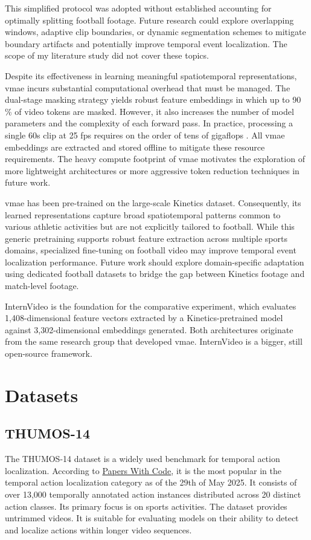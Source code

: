 This simplified protocol was adopted without established accounting for optimally splitting football footage. Future research could explore overlapping windows, adaptive clip boundaries, or dynamic segmentation schemes to mitigate boundary artifacts and potentially improve temporal event localization. The scope of my literature study did not cover these topics.

Despite its effectiveness in learning meaningful spatiotemporal representations, \acrfull{vmae} incurs substantial computational overhead that must be managed. The dual-stage masking strategy yields robust feature embeddings in which up to 90 \% of video tokens are masked. However, it also increases the number of model parameters and the complexity of each forward pass. In practice, processing a single 60s clip at 25 fps requires on the order of tens of gigaflops \cite{wang_videomae_2023}. All \acrshort{vmae} embeddings are extracted and stored offline to mitigate these resource requirements. The heavy compute footprint of \acrshort{vmae} motivates the exploration of more lightweight architectures or more aggressive token reduction techniques in future work.

\acrshort{vmae} has been pre-trained on the large-scale Kinetics dataset. Consequently, its learned representations capture broad spatiotemporal patterns common to various athletic activities but are not explicitly tailored to football. While this generic pretraining supports robust feature extraction across multiple sports domains, specialized fine-tuning on football video may improve temporal event localization performance. Future work should explore domain-specific adaptation using dedicated football datasets to bridge the gap between Kinetics footage and match-level footage. 

InternVideo is the foundation for the comparative experiment, which evaluates 1,408-dimensional feature vectors extracted by a Kinetics-pretrained model against 3,302-dimensional embeddings generated. Both architectures originate from the same research group that developed \acrshort{vmae}. InternVideo is a bigger, still open-source framework.


\section{Datasets}
\label{sec:method_datasets}

\subsection{THUMOS-14}
\label{ssec:method_thumos14}
The THUMOS-14 dataset \cite{dataset:thumos} is a widely used benchmark for temporal action localization. According to \hyperlink{https://paperswithcode.com/dataset/thumos14-1}{Papers With Code}, it is the most popular in the temporal action localization category as of the 29th of May 2025. It consists of over 13,000 temporally annotated action instances distributed across 20 distinct action classes. Its primary focus is on sports activities. The dataset provides untrimmed videos. It is suitable for evaluating models on their ability to detect and localize actions within longer video sequences. 

